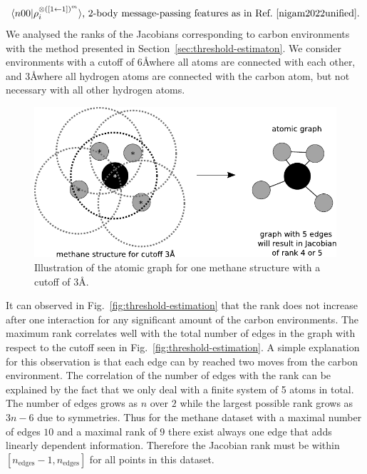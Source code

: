 \begin{equation}
  \langle n00| \rho_i^{\otimes([1\leftarrow1])^{m}} \rangle\textrm{, 2-body message-passing features as in Ref.~\cite{nigam2022unified}}.
    \label{eq:schnet-message-passing}
\end{equation}
We analysed the ranks of the Jacobians corresponding to carbon environments with the method presented in Section~\ref{sec:threshold-estimaton}.
We consider environments with a cutoff of $6$\AA where all atoms are connected with each other, and $3$\AA where all hydrogen atoms are connected with the carbon atom, but not necessary with all other hydrogen atoms.
\begin{figure}
    \centering
    \includegraphics[width=\textwidth]{fig/atomic_graph.pdf}
    \caption{Illustration of the atomic graph for one methane structure with a cutoff of $3$\AA.}
    \label{fig:atomic-graph}
\end{figure}
It can observed in Fig.~\ref{fig:threshold-estimation} that the rank does not increase after one interaction for any significant amount of the carbon environments.
The maximum rank correlates well with the total number of edges in the graph with respect to the cutoff seen in Fig.~\ref{fig:threshold-estimation}.
A simple explanation for this observation is that each edge can by reached two moves from the carbon environment.
The correlation of the number of edges with the rank can be explained by the fact that we only deal with a finite system of 5 atoms in total.
The number of edges grows as $n$ over $2$ while the largest possible rank grows as $3n-6$ due to symmetries.
Thus for the methane dataset with a maximal number of edges $10$ and a maximal rank of $9$ there exist always one edge that adds linearly dependent information.
Therefore the Jacobian rank must be within $[n_\textrm{edges}-1, n_\textrm{edges}]$ for all points in this dataset.
